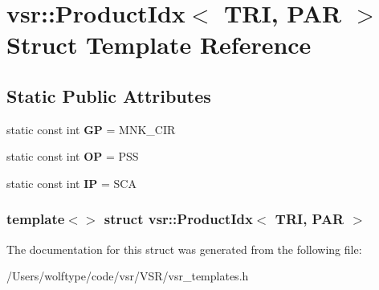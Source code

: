 \hypertarget{structvsr_1_1_product_idx_3_01_t_r_i_00_01_p_a_r_01_4}{\section{vsr\-:\-:Product\-Idx$<$ T\-R\-I, P\-A\-R $>$ Struct Template Reference}
\label{structvsr_1_1_product_idx_3_01_t_r_i_00_01_p_a_r_01_4}
}
\subsection*{Static Public Attributes}
\begin{DoxyCompactItemize}
\item 
\hypertarget{structvsr_1_1_product_idx_3_01_t_r_i_00_01_p_a_r_01_4_a614bbe3b9c0864eeaf5e08982b21da9d}{static const int {\bfseries G\-P} = M\-N\-K\-\_\-\-C\-I\-R}\label{structvsr_1_1_product_idx_3_01_t_r_i_00_01_p_a_r_01_4_a614bbe3b9c0864eeaf5e08982b21da9d}

\item 
\hypertarget{structvsr_1_1_product_idx_3_01_t_r_i_00_01_p_a_r_01_4_a23679414ade71008465973601d1686b7}{static const int {\bfseries O\-P} = P\-S\-S}\label{structvsr_1_1_product_idx_3_01_t_r_i_00_01_p_a_r_01_4_a23679414ade71008465973601d1686b7}

\item 
\hypertarget{structvsr_1_1_product_idx_3_01_t_r_i_00_01_p_a_r_01_4_a84fed63aaba1b4c8582f598e285ecd86}{static const int {\bfseries I\-P} = S\-C\-A}\label{structvsr_1_1_product_idx_3_01_t_r_i_00_01_p_a_r_01_4_a84fed63aaba1b4c8582f598e285ecd86}

\end{DoxyCompactItemize}
\subsubsection*{template$<$$>$ struct vsr\-::\-Product\-Idx$<$ T\-R\-I, P\-A\-R $>$}



The documentation for this struct was generated from the following file\-:\begin{DoxyCompactItemize}
\item 
/\-Users/wolftype/code/vsr/\-V\-S\-R/vsr\-\_\-templates.\-h\end{DoxyCompactItemize}
